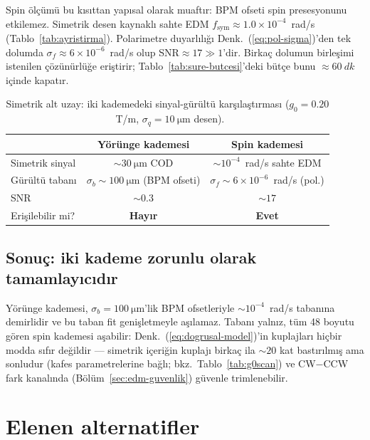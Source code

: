 \documentclass[preprint,12pt]{elsarticle}
\begin{document}
Spin ölçümü bu kısıttan yapısal olarak muaftır: BPM ofseti spin
presesyonunu etkilemez. Simetrik desen kaynaklı sahte EDM
$f_\mathrm{sym}\approx1.0\times10^{-4}$~rad/s (Tablo~\ref{tab:ayristirma}).
Polarimetre duyarlılığı Denk.~(\ref{eq:pol-sigma})'den tek dolumda
$\sigma_f\approx6\times10^{-6}$~rad/s olup SNR$\approx17\gg1$'dir.
Birkaç dolumun birleşimi istenilen çözünürlüğe eriştirir;
Tablo~\ref{tab:sure-butcesi}'deki bütçe bunu $\approx\SI{60}{dk}$
içinde kapatır.

\begin{table}[htb]
\centering
\caption{Simetrik alt uzay: iki kademedeki sinyal-gürültü karşılaştırması
($g_0=0.20$~T/m, $\sigma_q=\SI{10}{\micro\meter}$ desen).}
\label{tab:erisim}
\begin{tabular}{lcc}
\toprule
 & Yörünge kademesi & Spin kademesi \\
\midrule
Simetrik sinyal & $\sim\SI{30}{\micro\meter}$ COD
                & $\sim10^{-4}$~rad/s sahte EDM \\
Gürültü tabanı  & $\sigma_b\sim\SI{100}{\micro\meter}$ (BPM ofseti)
                & $\sigma_f\sim6\times10^{-6}$~rad/s (pol.) \\
SNR             & $\sim0.3$     & $\sim17$ \\
Erişilebilir mi?& \textbf{Hayır} & \textbf{Evet} \\
\bottomrule
\end{tabular}
\end{table}

\subsection{Sonuç: iki kademe zorunlu olarak tamamlayıcıdır}

Yörünge kademesi, $\sigma_b=\SI{100}{\micro\meter}$'lik BPM
ofsetleriyle $\sim10^{-4}$~rad/s tabanına demirlidir ve bu taban fit
genişletmeyle aşılamaz. Tabanı yalnız, tüm 48 boyutu gören spin
kademesi aşabilir: Denk.~(\ref{eq:dogrusal-model})'in kuplajları
hiçbir modda sıfır değildir --- simetrik içeriğin kuplajı birkaç ila
$\sim20$ kat bastırılmış ama sonludur (kafes parametrelerine bağlı;
bkz.\ Tablo~\ref{tab:g0scan}) ve CW$-$CCW fark kanalında
(Bölüm~\ref{sec:edm-guvenlik}) güvenle trimlenebilir.

\section{Elenen alternatifler}
\label{sec:elenen}
\end{document}
